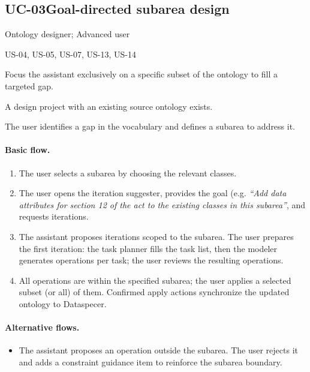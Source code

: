 \documentclass{article}
\begin{document}
\subsection{UC-03\quad Goal-directed subarea design}
\label{sec:uc-03}

\begin{description}[leftmargin=3.8cm,style=nextline]
  \item[Actors] Ontology designer; Advanced user
  \item[Based on user stories] US-04, US-05, US-07, US-13, US-14
  \item[Goal] Focus the assistant exclusively on a specific subset of the ontology to fill a targeted gap.
  \item[Pre-conditions]
    A design project with an existing source ontology exists.
  \item[Trigger] The user identifies a gap in the vocabulary and defines a subarea to address it.
\end{description}

\paragraph*{Basic flow.}
\begin{enumerate}
  \item The user selects a subarea by choosing the relevant classes.
  \item The user opens the iteration suggester, provides the goal (e.g. \textit{``Add data attributes for section 12 of the act to the existing classes in this subarea''}, and requests iterations.
  \item The assistant proposes iterations scoped to the subarea. The user prepares the first iteration: the task planner fills the task list, then the modeler generates operations per task; the user reviews the resulting operations.
  \item All operations are within the specified subarea; the user applies a selected subset (or all) of them. Confirmed apply actions synchronize the updated ontology to Dataspecer.
\end{enumerate}

\paragraph*{Alternative flows.}
\begin{itemize}
  \item[3a.] The assistant proposes an operation outside the subarea. The user rejects it and adds a constraint guidance item to reinforce the subarea boundary.
\end{itemize}
\end{document}
